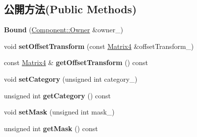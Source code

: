 \subsection*{公開方法(Public Methods)}
\begin{DoxyCompactItemize}
\item 
{\bfseries Bound} (\hyperlink{class_i_dream_sky_1_1_component_1_1_owner}{Component\+::\+Owner} \&owner\+\_\+)\hypertarget{class_i_dream_sky_1_1_selection3_1_1_bound_a6911f74c665cc70ebc778c96e0284c15}{}\label{class_i_dream_sky_1_1_selection3_1_1_bound_a6911f74c665cc70ebc778c96e0284c15}

\item 
void {\bfseries set\+Offset\+Transform} (const \hyperlink{class_i_dream_sky_1_1_matrix4}{Matrix4} \&offset\+Transform\+\_\+)\hypertarget{class_i_dream_sky_1_1_selection3_1_1_bound_ac6dc47db7f003eedb3b30186a1d1a5d1}{}\label{class_i_dream_sky_1_1_selection3_1_1_bound_ac6dc47db7f003eedb3b30186a1d1a5d1}

\item 
const \hyperlink{class_i_dream_sky_1_1_matrix4}{Matrix4} \& {\bfseries get\+Offset\+Transform} () const \hypertarget{class_i_dream_sky_1_1_selection3_1_1_bound_a20be04c31cb50351da9bb71ebd13e9d9}{}\label{class_i_dream_sky_1_1_selection3_1_1_bound_a20be04c31cb50351da9bb71ebd13e9d9}

\item 
void {\bfseries set\+Category} (unsigned int category\+\_\+)\hypertarget{class_i_dream_sky_1_1_selection3_1_1_bound_ab939907c38692c0170938cb6198690db}{}\label{class_i_dream_sky_1_1_selection3_1_1_bound_ab939907c38692c0170938cb6198690db}

\item 
unsigned int {\bfseries get\+Category} () const \hypertarget{class_i_dream_sky_1_1_selection3_1_1_bound_afb37fa2f507542dff33336bedb46179a}{}\label{class_i_dream_sky_1_1_selection3_1_1_bound_afb37fa2f507542dff33336bedb46179a}

\item 
void {\bfseries set\+Mask} (unsigned int mask\+\_\+)\hypertarget{class_i_dream_sky_1_1_selection3_1_1_bound_a89bf3e622354f3539ae4cd0d2dc83df1}{}\label{class_i_dream_sky_1_1_selection3_1_1_bound_a89bf3e622354f3539ae4cd0d2dc83df1}

\item 
unsigned int {\bfseries get\+Mask} () const \hypertarget{class_i_dream_sky_1_1_selection3_1_1_bound_ab9ff6c3591ca3dab7008566a91f263e5}{}\label{class_i_dream_sky_1_1_selection3_1_1_bound_ab9ff6c3591ca3dab7008566a91f263e5}


\end{DoxyCompactItemize}
